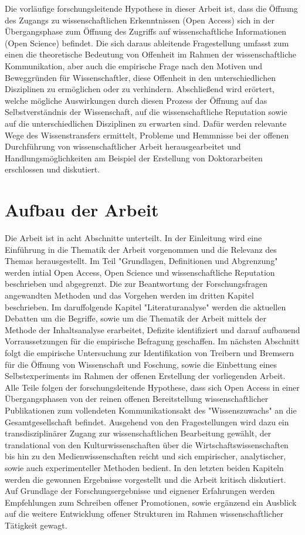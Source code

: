 Die vorläufige forschungsleitende Hypothese in dieser Arbeit ist, dass die Öffnung des Zugangs zu wissenschaftlichen Erkenntnissen (Open Access) sich in der Übergangsphase zum Öffnung des Zugriffs auf wissenschaftliche Informationen (Open Science) befindet. Die sich daraus ableitende Fragestellung umfasst zum einen die theoretische Bedeutung von Offenheit im Rahmen der wissenschaftliche Kommunikation, aber auch die empirische Frage nach den Motiven und Beweggründen für Wissenschaftler, diese Offenheit in den unterschiedlichen Disziplinen zu ermöglichen oder zu verhindern. Abschließend wird erörtert, welche mögliche Auswirkungen durch diesen Prozess der Öffnung auf das Selbstverständnis der Wissenschaft, auf die wissenschaftliche Reputation sowie auf die unterschiedlichen Disziplinen zu erwarten sind. Dafür werden relevante Wege des Wissenstransfers ermittelt, Probleme und Hemmnisse bei der offenen Durchführung von wissenschaftlicher Arbeit herausgearbeitet und Handlungsmöglichkeiten am Beispiel der Erstellung von Doktorarbeiten erschlossen und diskutiert.

\section{Aufbau der Arbeit} 

Die Arbeit ist in acht Abschnitte unterteilt. In der Einleitung wird eine Einführung in die Thematik der Arbeit vorgenommen und die Relevanz des Themas herausgestellt. Im Teil "Grundlagen, Definitionen und Abgrenzung" werden intial Open Access, Open Science und wissenschaftliche Reputation beschrieben und abgegrenzt. Die zur Beantwortung der Forschungsfragen angewandten Methoden und das Vorgehen werden im dritten Kapitel beschrieben. Im daruffolgende Kapitel "Literaturanalyse" werden die aktuellen Debatten um die Begriffe, sowie um die Thematik der Arbeit mittels der Methode der Inhaltsanalyse erarbeitet, Defizite identifiziert und darauf aufbauend Vorraussetzungen für die empirische Befragung geschaffen. Im nächsten Abschnitt folgt die empirische Untersuchung zur Identifikation von Treibern und Bremsern für die Öffnung von Wissenschaft und Foschung, sowie die Einbettung eines Selbstexperiments im Rahmen der offenen Erstellung der vorliegenden Arbeit. Alle Teile folgen der forschungsleitende Hypothese, dass sich Open Access in einer Übergangsphasen von der reinen offenen Bereitstellung wissenschaftlicher Publikationen zum vollendeten Kommunikationsakt des "Wissenszuwachs" \cite{Luhmann1998} an die Gesamtgesellschaft befindet. Ausgehend von den Fragestellungen wird dazu ein transdisziplinärer Zugang zur wissenschaftlichen Bearbeitung gewählt, der translational von den Kulturwissenschaften über die Wirtschaftswissenschaften bis hin zu den Medienwissenschaften reicht und sich empirischer, analytischer, sowie auch experimenteller Methoden bedient. In den letzten beiden Kapiteln werden die gewonnen Ergebnisse vorgestellt und die Arbeit kritisch diskutiert. Auf Grundlage der Forschungsergebnisse und eignener Erfahrungen werden Empfehlungen zum Schreiben offener Promotionen, sowie ergänzend ein Ausblick auf die weitere Entwicklung offener Strukturen im Rahmen wissenschaftlicher Tätigkeit gewagt.
